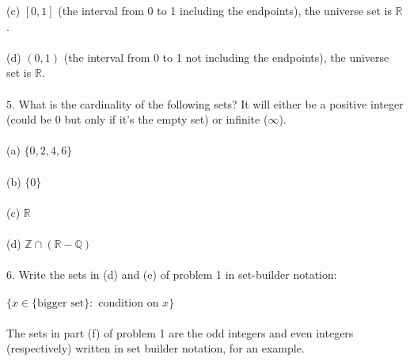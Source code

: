 \documentclass{article}
\newcommand{\R}{\mathbb{R}}
\newcommand{\Z}{\mathbb{Z}}
\newcommand{\Q}{\mathbb{Q}}
\begin{document}
(c) $[0,1]$ (the interval from 0 to 1 including the endpoints), the universe set is $\R$. \\ \\
(d) $(0,1)$ (the interval from 0 to 1 not including the endpoints), the universe set is $\R$. \\ \\
5. What is the cardinality of the following sets? It will either be a positive integer (could be 0 but only if it's the empty set) or infinite ($\infty$). \\ \\
(a) $\{0,2,4,6\}$ \\ \\
(b) $\{0\}$ \\ \\
(c) $\R$ \\ \\
(d) $\Z \cap (\R - \Q)$ \\ \\
6. Write the sets in (d) and (e) of problem 1 in set-builder notation: \\ \\
$\{ x \in \{\text{bigger set} \} : \text{ condition on }x \}$  \\ \\
The sets in part (f) of problem 1 are the odd integers and even integers (respectively) written in set builder notation, for an example. 
\end{document}
